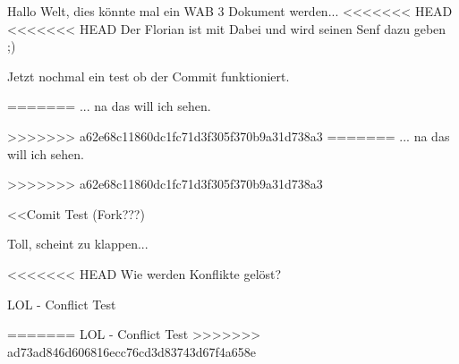 \documentclass[a4paper,12pt]{scrreprt}
\begin{document}
Hallo Welt, dies könnte mal ein WAB 3 Dokument werden...
<<<<<<< HEAD
<<<<<<< HEAD
Der Florian ist mit Dabei und wird seinen Senf dazu geben ;)

Jetzt nochmal ein test ob der Commit funktioniert.

=======
... na das will ich sehen.

>>>>>>> a62e68c11860dc1fc71d3f305f370b9a31d738a3
=======
... na das will ich sehen.

>>>>>>> a62e68c11860dc1fc71d3f305f370b9a31d738a3

<<Comit Test (Fork???)

Toll, scheint zu klappen...

<<<<<<< HEAD
Wie werden Konflikte gelöst?

LOL - Conflict Test

=======
LOL - Conflict Test
>>>>>>> ad73ad846d606816ecc76cd3d83743d67f4a658e
\end{document}
